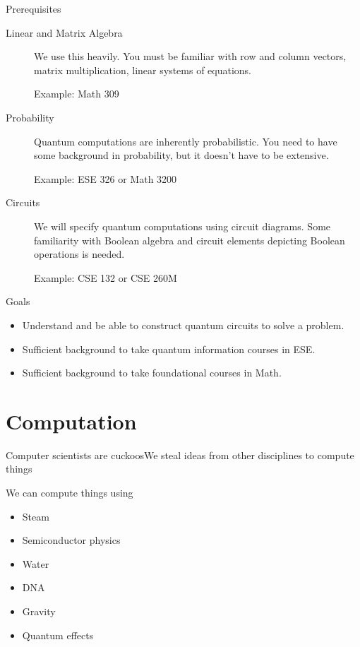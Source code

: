 \begin{frame}{Prerequisites}
\begin{description}
    \item[Linear and Matrix Algebra] We use this heavily.  You must be familiar with row and column vectors, matrix multiplication, linear systems of equations.
    
    Example:  Math 309
    \item[Probability] Quantum computations are inherently probabilistic.  You need to have some background in probability, but it doesn't have to be extensive.
    
    Example:  ESE 326 or Math 3200
    \item[Circuits]  We will specify quantum computations using circuit diagrams.  Some familiarity with Boolean algebra and circuit elements depicting Boolean operations is needed.
    
    Example:  CSE 132 or CSE 260M
\end{description}
\end{frame}
\begin{frame}{Goals}
\begin{itemize}
    \item Understand and be able to construct quantum circuits to solve a problem.
    \item Sufficient background to take quantum information courses in ESE.
    \item Sufficient background to take foundational courses in Math.
\end{itemize}
\end{frame}

\section{Computation}

\begin{frame}{Computer scientists are cuckoos}{We steal ideas from other disciplines to compute things}

We can compute things using
\begin{itemize}
    \item Steam
    \item Semiconductor physics
    \item Water
    \item DNA
    \item \alert{Gravity}
    \item Quantum effects
\end{itemize}
    
\end{frame}

